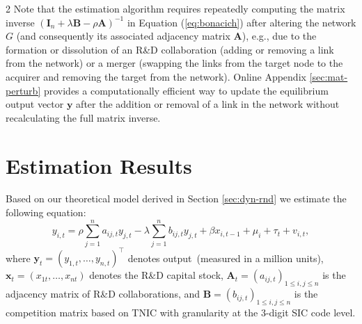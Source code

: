 \documentclass[12pt]{article}
\begin{document}
\begin{spacing}{2}
Note that the estimation algorithm requires repeatedly computing the matrix inverse $(\mathbf{I}_n + \lambda \mathbf{B} - \rho \mathbf{A})^{-1}$ in Equation (\ref{eq:bonacich}) after altering the network $G$ (and consequently its associated adjacency matrix $\mathbf{A}$), e.g., due to the formation or dissolution of an R\&D collaboration (adding or removing a link from the network) or a merger (swapping the links from the target node to the acquirer and removing the target from the network). Online Appendix \ref{sec:mat-perturb} provides a computationally efficient way to update the equilibrium output vector $\mathbf{y}$ after the addition or removal of a link in the network without recalculating the full matrix inverse.%

\section{Estimation Results}
\label{sec:results}
Based on our theoretical model derived in Section \ref{sec:dyn-rnd} we estimate the following equation:
\begin{equation}
y_{i,t}= \rho \sum_{j=1}^{n}a_{ij,t} y_{j,t} - \lambda \sum_{j=1}^{n}b_{ij,t} y_{j,t} + \beta x_{i,t-1} + \mu_i + \tau_t+ v_{i,t},
\end{equation}
where $\mathbf{y}_t = (y_{1,t},\ldots,y_{n,t})^\top$ denotes output~(measured in a million units), $\mathbf{x}_t=(x_{1t},\ldots,x_{nt})$ denotes the R\&D capital stock, $\mathbf{A}_t=(a_{ij,t})_{1 \le i,j \le n}$ is the adjacency matrix of R\&D collaborations, and $\mathbf{B}=(b_{ij,t})_{1 \le i,j \le n}$ is the competition matrix based on TNIC with granularity at the 3-digit SIC code level. 



\end{spacing}
\end{document}

